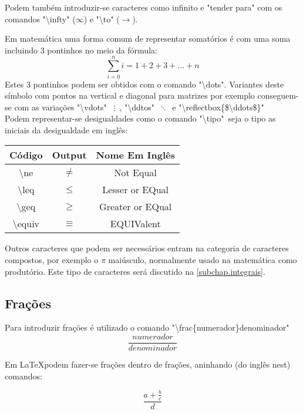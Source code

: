 Podem também introduzir-se caracteres como infinito e "tender para" com os comandos "\textbackslash infty" ($\infty$) e "\textbackslash to" ($\to$).

Em matemática uma forma comum de representar somatórios é com uma soma incluindo 3 pontinhos no meio da fórmula:
$$\sum_{i = 0}^{n} i = 1 + 2 + 3 + \dots + n$$
Estes 3 pontinhos podem ser obtidos com o comando "\textbackslash dots". Variantes deste símbolo com pontos na vertical e diagonal para matrizes por exemplo conseguem-se com as variações "\textbackslash vdots" \, $\vdots$ \,, "\textbackslash ddtos" \,$\ddots$\, e "\textbackslash reflectbox\{\$\textbackslash ddots\$\}"\, \\

Podem representar-se desigualdades como o comando "\textbackslash tipo"\, seja o tipo as iniciais da desigualdade em inglês:
\begin{table}[h]
\center
\begin{tabular}{|c|c|c|}

\hline
Código & Output & Nome Em Inglês \\ \hline
\textbackslash ne & $\ne$ & Not Equal \\ \hline
\textbackslash leq & $\leq$ & Lesser or EQual \\ \hline
\textbackslash geq & $\geq$ & Greater or EQual \\ \hline
\textbackslash equiv & $\equiv$ & EQUIValent \\ \hline

\end{tabular}
\end{table}

Outros caracteres que podem ser necessários entram na categoria de caracteres compostos, por exemplo o $\pi$ maiúsculo, normalmente usado na matemática como produtório. Este tipo de caracteres será discutido na \autoref{subchap.integrais}.

\subsection{Frações}
Para introduzir frações é utilizado o comando "\textbackslash frac\{numerador\}{denominador}"\\

$$\frac{numerador}{denominador}$$

Em     \LaTeX podem fazer-se frações dentro de frações, aninhando (do inglês nest) comandos:

$$\frac{a + \frac{b}{c}}{d}$$

